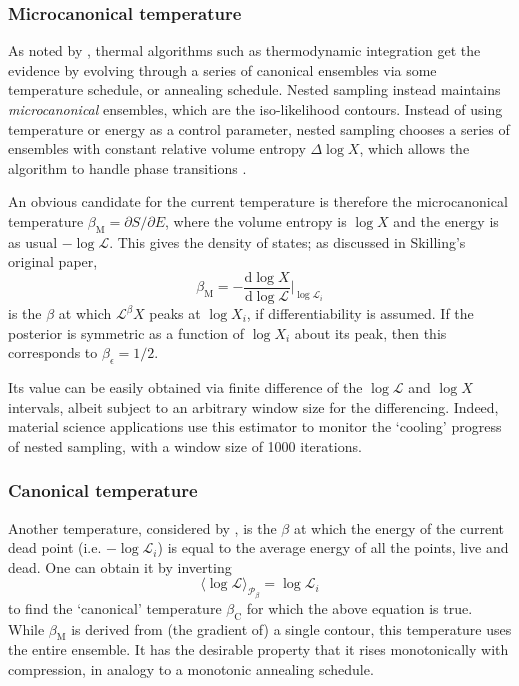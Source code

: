 \documentclass[usenatbib]{mnras}
\newcommand{\Like}{\mathcal{L}}
\begin{document}
\subsubsection{Microcanonical temperature}
As noted by \citet{demons}, thermal algorithms such as thermodynamic integration \citep{path_sampling} get the evidence by evolving through a series of canonical ensembles via some temperature schedule, or annealing schedule. Nested sampling instead maintains \textit{microcanonical} ensembles, which are the iso-likelihood contours. Instead of using temperature \citep{simulated_annealing, parallel_tempering} or energy \citep{wang_landau} as a control parameter, nested sampling chooses a series of ensembles with constant relative volume entropy $\Delta \log X$, which allows the algorithm to handle phase transitions \citep{baldock}.
\par
An obvious candidate for the current temperature is therefore the microcanonical temperature $\beta_\mathrm{M} = \partial S/\partial E$, where the volume entropy is $\log X$ and the energy is as usual $-\log \Like$. This gives the density of states; as discussed in Skilling's original paper,
\begin{equation}
    \beta_\mathrm{M}  = - \frac{\mathrm{d} \log X}{\mathrm{d} \log \Like} \Bigg\vert_{\log \Like_i}
\end{equation}
is the $\beta$ at which $\Like^{\beta} X$ peaks at $\log X_i$, if differentiability is assumed. If the posterior is symmetric as a function of $\log X_i$ about its peak, then this corresponds to $\beta_\epsilon = 1/2$.
\par
Its value can be easily obtained via finite difference of the $\log \Like$ and $\log X$ intervals, albeit subject to an arbitrary window size for the differencing. Indeed, material science applications \citep{Baldock_2017} use this estimator to monitor the `cooling' progress of nested sampling, with a window size of 1000 iterations.

\subsubsection{Canonical temperature}\label{sec:canonical_temperature}
Another temperature, considered by \citet{demons}, is the $\beta$ at which the energy of the current dead point (i.e. $-\log \Like_i$) is equal to the average energy of all the points, live and dead. One can obtain it by inverting 
\begin{equation}
    \langle \log \Like \rangle_{\mathcal{P}_\beta} = \log \Like_i
\end{equation}
to find the `canonical' temperature $\beta_\mathrm{C}$ for which the above equation is true. While $\beta_\mathrm{M}$ is derived from (the gradient of) a single contour, this temperature uses the entire ensemble. It has the desirable property that it rises monotonically with compression, in analogy to a monotonic annealing schedule.
\end{document}
